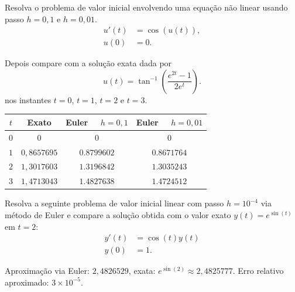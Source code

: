 \begin{exer} Resolva o problema de valor inicial envolvendo uma equação não linear usando passo $h=0,1$ e $h=0,01$.
 \begin{equation}
  \begin{split}
    u'(t)&=\cos(u(t)),\\
    u(0)&=0.
  \end{split}
 \end{equation}

Depois compare com a solução exata dada por
\begin{equation}u(t)=\tan^{-1} \left( \frac {e^{2t}-1}{{2 e^t}}
 \right).
\end{equation}
nos instantes $t=0$, $t=1$, $t=2$ e $t=3$.
\end{exer}
\begin{resp}
\begin{center}
  \begin{tabular}{|c|c|c|c|}\hline
    $t$ &  Exato & Euler~~ $h=0,1$ & Euler~~ $h=0,01$\\\hline
    $0$ &  $0$ & $0$ & $0$\\\hline
    $1$ &   $0,8657695 $ & $ 0.8799602$   &   $0.8671764 $  \\\hline
    $2$ &   $1,3017603 $ & $ 1.3196842 $   &  $  1.3035243$     \\\hline
    $3$ &   $1,4713043 $  & $ 1.4827638 $ & $1.4724512 $   \\\hline
  \end{tabular}
\end{center}
\end{resp}

\begin{exer} Resolva a seguinte problema de valor inicial linear com passo $h=10^{-4}$ via método de Euler e compare a solução obtida com o valor exato $y(t)=e^{\sin(t)}$ em $t=2$:
 \begin{equation}
  \begin{split}
    y'(t)&=\cos(t)y(t)\\
    y(0)&=1.
  \end{split}
 \end{equation}
\end{exer}
\begin{resp}
 Aproximação via Euler: $2,4826529 $, exata: $e^{\sin(2)}\approx 2,4825777 $. Erro relativo aproximado: $ 3\times 10^{-5}$.
\end{resp}

